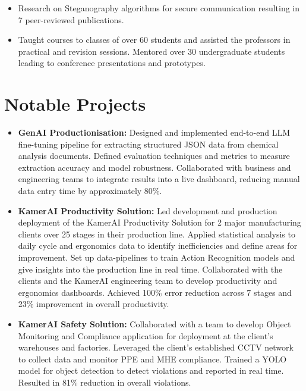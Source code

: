 \documentclass[a4paper,11pt]{article}
\begin{document}
      \begin{itemize}[leftmargin=*, itemsep = -2pt]
        \item {Research on Steganography algorithms for secure communication resulting in 7 peer-reviewed publications.}
        \item {Taught courses to classes of over 60 students and assisted the professors in practical and revision sessions. Mentored over 30 undergraduate students leading to conference presentations and prototypes.}
      \end{itemize}

\section{Notable Projects}
  \begin{itemize}[leftmargin=*, itemsep = -2pt]
    \item {\textbf{GenAI Productionisation:}} Designed and implemented end-to-end LLM fine-tuning pipeline for extracting structured JSON data from chemical analysis documents. Defined evaluation techniques and metrics to measure extraction accuracy and model robustness. Collaborated with business and engineering teams to integrate results into a live dashboard, reducing manual data entry time by approximately 80\%.
    \item {\textbf{KamerAI Productivity Solution:} Led development and production deployment of the KamerAI Productivity Solution for 2 major manufacturing clients over 25 stages in their production line. Applied statistical analysis to daily cycle and ergonomics data to identify inefficiencies and define areas for improvement. Set up data-pipelines to train Action Recognition models and give insights into the production line in real time. Collaborated with the clients and the KamerAI engineering team to develop productivity and ergonomics dashboards. Achieved 100\% error reduction across 7 stages and 23\% improvement in overall productivity.}
    \item {\textbf{KamerAI Safety Solution:} Collaborated with a team to develop Object Monitoring and Compliance application for deployment at the client's warehouses and factories. Leveraged the client's established CCTV network to collect data and monitor PPE and MHE compliance. Trained a YOLO model for object detection to detect violations and reported in real time. Resulted in 81\% reduction in overall violations.}
    
 
  \end{itemize}
\end{document}
